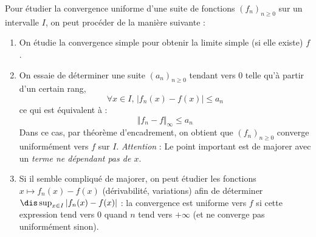 \documentclass[a4paper,10pt]{report}
\begin{document}
\begin{metho} Pour étudier la convergence uniforme d'une suite de fonctions $(f_n)_{n \geq 0}$  sur un intervalle $I$, on peut procéder de la manière suivante :

\begin{enumerate}
\item On étudie la convergence simple pour obtenir la limite simple (si elle existe) $f$.
\item On essaie de déterminer une suite $(a_n)_{n \geq 0}$ tendant vers $0$ telle qu'à partir d'un certain rang,
$$ \forall x \in I, \, \vert f_n(x)-f(x) \vert \leq a_n$$
ce qui est équivalent à :
$$ \Vert f_n - f \Vert_{\infty} \leq a_n$$
Dans ce cas, par théorème d'encadrement, on obtient que $(f_n)_{n \geq 0}$ converge uniformément vers $f$ sur $I$. \textit{Attention} : Le point important est de majorer avec un \textit{terme ne dépendant pas de $x$}.
\item Si il semble compliqué de majorer, on peut étudier les fonctions $x \mapsto f_n(x)-f(x)$ (dérivabilité, variations) afin de déterminer $\dis \sup_{x \in I} \vert f_n(x)-f(x) \vert$ : la convergence est uniforme vers $f$ si cette expression tend vers $0$ quand $n$ tend vers $+ \infty$ (et ne converge pas uniformément sinon). 
\end{enumerate}
\end{metho}
\end{document}
